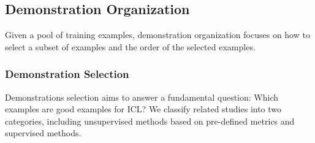 \subsection{Demonstration Organization}
\label{sec:organ}
Given a pool of training examples, demonstration organization focuses on how to select a subset of examples and the order of the selected examples. 


\subsubsection{Demonstration Selection}
\label{sec:select}


Demonstrations selection aims to answer a fundamental question: Which examples are good examples for ICL? We classify related studies into two categories, including unsupervised methods based on pre-defined metrics and supervised methods.


